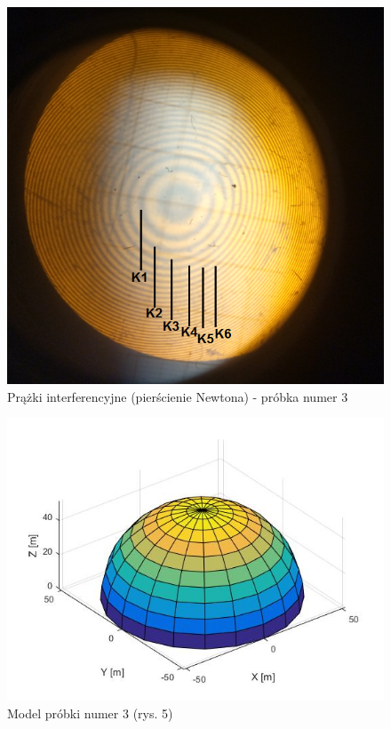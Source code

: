 \documentclass[12pt, a4paper, oneside]{article}
\begin{document}
\begin{figure}[t]
\centering
\caption{Prążki interferencyjne (pierścienie Newtona) - próbka numer 3}
\includegraphics[scale=.55]{pics/f4.png}
\end{figure}
\begin{figure}[b]
\centering
\caption{Model próbki numer 3 (rys. 5)}
\includegraphics[scale=.55]{pics/w2.jpg}
\end{figure}
\clearpage
\end{document}
